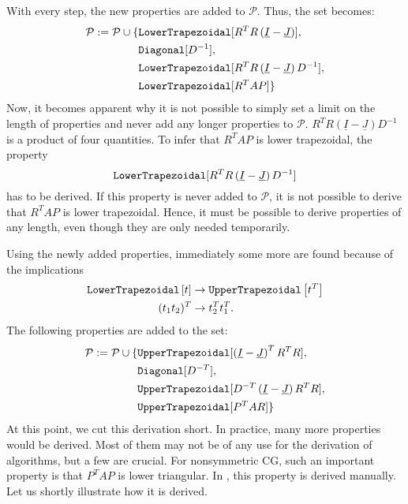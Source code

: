 %
With every step, the new properties are added to $\mathcal{P}$. Thus, the set becomes:
%
\begin{align*}
\mathcal{P} := \mathcal{P} \cup \{ & \text{\ttfamily LowerTrapezoidal}[R^TR \left( \underline{I} - \underline{J}  \right) ], \\
	& \text{\ttfamily Diagonal}[D^{-1} ], \\
	& \text{\ttfamily LowerTrapezoidal}[R^TR \left( \underline{I} - \underline{J}  \right)D^{-1} ], \\
	& \text{\ttfamily LowerTrapezoidal}[R^T A P ] \}
\end{align*}
%
Now, it becomes apparent why it is not possible to simply set a limit on the length of properties and never add any longer properties to $\mathcal{P}$. $R^TR \left( \underline{I} - \underline{J}  \right)D^{-1}$ is a product of four quantities. To infer that $R^T A P$ is lower trapezoidal, the property $$\text{\ttfamily LowerTrapezoidal}[R^TR \left( \underline{I} - \underline{J}  \right)D^{-1}]$$ has to be derived. If this property is never added to $\mathcal{P}$, it is not possible to derive that $R^T A P$ is lower trapezoidal. Hence, it must be possible to derive properties of any length, even though they are only needed temporarily.

Using the newly added properties, immediately some more are found because of the implications 
%
\begin{align*}
\text{\ttfamily LowerTrapezoidal} \left[t\right] &\rightarrow \text{\ttfamily UpperTrapezoidal} \left[ t^T \right] \\
(t_1 t_2)^T &\rightarrow t_2^T t_1^T \text{.}
\end{align*}
%
The following properties are added to the set:
%
\begin{align*}
\mathcal{P} := \mathcal{P} \cup \{ & \text{\ttfamily UpperTrapezoidal}[ \left( \underline{I} - \underline{J}  \right)^T R^TR ], \\
	& \text{\ttfamily Diagonal} [D^{-T} ], \\
	& \text{\ttfamily UpperTrapezoidal} [ D^{-T} \left( \underline{I} - \underline{J} \right) R^TR ], \\
	& \text{\ttfamily UpperTrapezoidal} [P^T A R ] \}
\end{align*}
%
At this point, we cut this derivation short. In practice, many more properties would be derived. Most of them may not be of any use for the derivation of algorithms, but a few are crucial. For nonsymmetric CG, such an important property is that $P^T A P$ is lower triangular. In \cite{eijkhout:CGderivation}, this property is derived manually. Let us shortly illustrate how it is derived.

